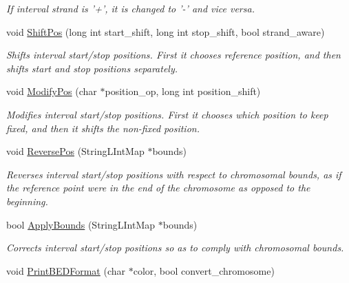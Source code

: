 \begin{DoxyCompactItemize}
\begin{DoxyCompactList}\small\item\em If interval strand is '+', it is changed to '-\/' and vice versa. \end{DoxyCompactList}\item 
void \hyperlink{classGenomicInterval_aac9a744d5ecd181d6ddc9b7e47605a59}{ShiftPos} (long int start\_\-shift, long int stop\_\-shift, bool strand\_\-aware)
\begin{DoxyCompactList}\small\item\em Shifts interval start/stop positions. First it chooses reference position, and then shifts start and stop positions separately. \end{DoxyCompactList}\item 
void \hyperlink{classGenomicInterval_a96b34b76019001c4751d4c4f868ee24d}{ModifyPos} (char $\ast$position\_\-op, long int position\_\-shift)
\begin{DoxyCompactList}\small\item\em Modifies interval start/stop positions. First it chooses which position to keep fixed, and then it shifts the non-\/fixed position. \end{DoxyCompactList}\item 
\hypertarget{classGenomicInterval_abf416450f25b579dfb76b2bd6a81aa6a}{
void \hyperlink{classGenomicInterval_abf416450f25b579dfb76b2bd6a81aa6a}{ReversePos} (StringLIntMap $\ast$bounds)}
\label{classGenomicInterval_abf416450f25b579dfb76b2bd6a81aa6a}

\begin{DoxyCompactList}\small\item\em Reverses interval start/stop positions with respect to chromosomal bounds, as if the reference point were in the end of the chromosome as opposed to the beginning. \end{DoxyCompactList}\item 
\hypertarget{classGenomicInterval_a3b49ca0f99d27ddadcfd96791cf77b89}{
bool \hyperlink{classGenomicInterval_a3b49ca0f99d27ddadcfd96791cf77b89}{ApplyBounds} (StringLIntMap $\ast$bounds)}
\label{classGenomicInterval_a3b49ca0f99d27ddadcfd96791cf77b89}

\begin{DoxyCompactList}\small\item\em Corrects interval start/stop positions so as to comply with chromosomal bounds. \end{DoxyCompactList}\item 
\hypertarget{classGenomicInterval_ac06925f3fcf6b47cec5c6f95aaa379c0}{
void \hyperlink{classGenomicInterval_ac06925f3fcf6b47cec5c6f95aaa379c0}{PrintBEDFormat} (char $\ast$color, bool convert\_\-chromosome)}
\label{classGenomicInterval_ac06925f3fcf6b47cec5c6f95aaa379c0}


\end{DoxyCompactItemize}
